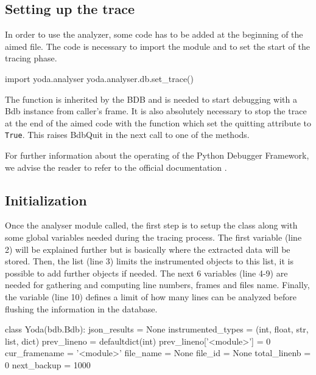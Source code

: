\subsection{Setting up the trace}
In order to use the analyzer, some code has to be added at the beginning of the aimed file. The code is necessary to import the module and to set the start of the tracing phase. 
\begin{python}
import yoda.analyser
yoda.analyser.db.set_trace()
\end{python}

The  function is inherited by the BDB and is needed to start debugging with a Bdb instance from caller’s frame.
It is also absolutely necessary to stop the trace at the end of the aimed code with the  function which set the quitting attribute to \texttt{True}. This raises BdbQuit in the next call to one of the  methods. 

For further information about the operating of the Python Debugger Framework, we advise the reader to refer to the official documentation \citep{Foundation2017}.

\subsection{Initialization}

Once the analyser module called, the first step is to setup the  class along with some global variables needed during the tracing process. The first variable  (line 2) will be explained further but is basically where the extracted data will be stored. Then, the  list (line 3) limits the instrumented objects to this list, it is possible to add further objects if needed. The next 6 variables (line 4-9) are needed for gathering and computing line numbers, frames and files name. Finally, the  variable (line 10) defines a limit of how many lines can be analyzed before flushing the information in the database.

\begin{python}
class Yoda(bdb.Bdb):
    json_results = None
    instrumented_types = (int, float, str, list, dict)
    prev_lineno = defaultdict(int)
    prev_lineno['<module>'] = 0 
    cur_framename = '<module>'
    file_name = None
    file_id = None 
    total_linenb = 0
    next_backup = 1000
\end{python}

